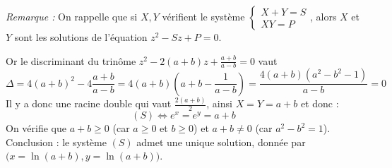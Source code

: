 {{\medskip

\emph{Remarque :} On rappelle
que si $X, Y$ vérifient le système 
$\left\{\begin{array}{l}
X+Y=S\\
XY=P
\end{array}\right.$, alors $X$ et $Y$ sont les solutions de l'équation $z^2-Sz+P=0$.
\medskip

Or le discriminant du trinôme $z^2-2(a+b)z+\frac{a+b}{a-b}=0$ vaut 
$$\Delta=4(a+b)^2-4\frac{a+b}{a-b}=4(a+b)\left(a+b-\frac{1}{a-b}\right)=\frac{4(a+b)(a^2-b^2-1)}{a-b}=0$$ 
Il y a donc une racine double qui vaut $\frac{2(a+b)}{2}$, ainsi $X=Y=a+b$ et donc :
$$(S)\Longleftrightarrow e^x=e^y=a+b$$
On vérifie que $a+b\ge 0$ (car $a\ge 0$ et $b\ge 0$) et $a+b\not=0$ (car $a^2-b^2=1$).
Conclusion : le système $(S)$ admet une unique solution, donnée par $\big(x=\ln(a+b),y=\ln(a+b)\big)$.}
}